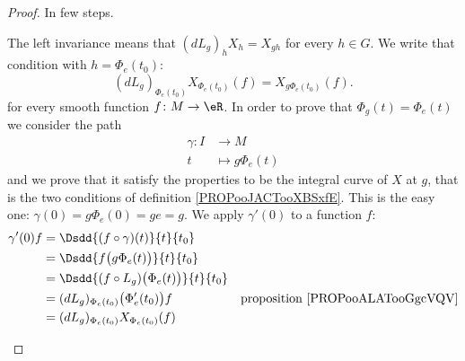 \begin{proof}
	In few steps.
	\begin{subproof}

		The left invariance means that $(dL_g)_hX_h=X_{gh}$ for every \( h\in G\). We write that condition with \( h=\Phi_e(t_0)\):
		\begin{equation}        \label{EQooPGWKooWNKslJ}
			(dL_g)_{\Phi_e(t_0)}X_{\Phi_e(t_0)}(f)=X_{g\Phi_e(t_0)}(f).
		\end{equation}
		for every smooth function \( f\colon M\to \eR\).
		In order to prove that \( \Phi_g(t)=\Phi_e(t)\) we consider the path
		\begin{equation}
			\begin{aligned}
				\gamma\colon I & \to M              \\
				t              & \mapsto g\Phi_e(t)
			\end{aligned}
		\end{equation}
		and we prove that it satisfy the properties to be the integral curve of \( X\) at \( g\), that is the two conditions of definition \ref{PROPooJACTooXBSxfE}.
		This is the easy one: \( \gamma(0)=g\Phi_e(0)=ge=g\).
		We apply \( \gamma'(0)\) to a function \( f\):
		\begin{subequations}
			\begin{align}
				\gamma'(0)f & =\Dsdd{ (f\circ \gamma)(t) }{t}{t_0}                                                                                     \\
				            & =\Dsdd{ f\big( g\Phi_e(t) \big) }{t}{t_0}                                                                                \\
				            & =\Dsdd{ (f\circ L_g)\big( \Phi_e(t) \big) }{t}{t_0}                                                                      \\
				            & =(dL_g)_{\Phi_e(t_0)}\big( \Phi_e'(t_0) \big)f                             & \text{proposition \ref{PROPooALATooGgcVQV}} \\
				            & =(dL_g)_{\Phi_e(t_0)}X_{\Phi_e(t_0)}(f)        \label{SUBEQooOMDOooFZaCLp}                                               \\

\end{align}
\end{subequations}
\end{subproof}
\end{proof}
